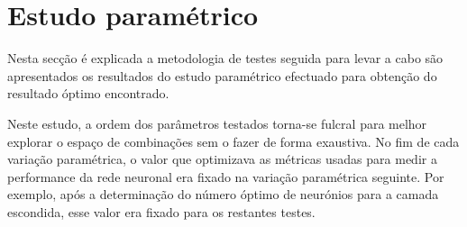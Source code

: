 \documentclass{article}
\begin{document}
\clearpage
\section{Estudo paramétrico}
\indent \indent Nesta secção é explicada a metodologia de testes seguida para levar a cabo são apresentados os resultados do estudo paramétrico efectuado para obtenção do resultado óptimo encontrado.

Neste estudo, a ordem dos parâmetros testados torna-se fulcral para melhor explorar o espaço de combinações sem o fazer de forma exaustiva. No fim de cada variação paramétrica, o valor que optimizava as métricas usadas para medir a performance da rede neuronal era fixado na variação paramétrica seguinte. Por exemplo, após a determinação do número óptimo de neurónios para a camada escondida, esse valor era fixado para os restantes testes.
\end{document}
